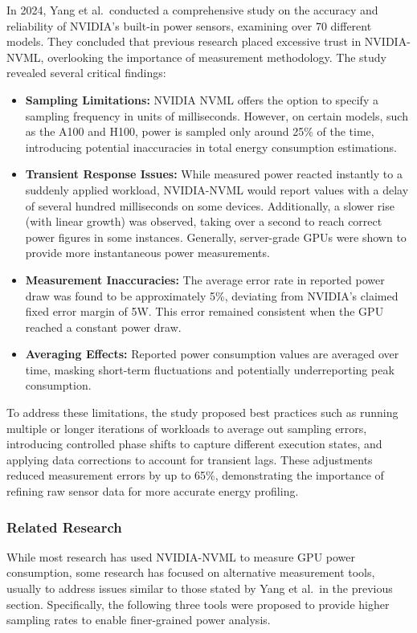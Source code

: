 In 2024, Yang et al.\ conducted a comprehensive study on the accuracy and reliability of NVIDIA's built-in power sensors, examining over 70 different models\cite{yang2024accurate}. They concluded that previous research placed excessive trust in NVIDIA-NVML, overlooking the importance of measurement methodology. The study revealed several critical findings:
\begin{itemize}
    \item \textbf{Sampling Limitations:} NVIDIA NVML offers the option to specify a sampling frequency in units of milliseconds. However, on certain models, such as the A100 and H100, power is sampled only around 25\% of the time, introducing potential inaccuracies in total energy consumption estimations.
    \item \textbf{Transient Response Issues:} While measured power reacted instantly to a suddenly applied workload, NVIDIA-NVML would report values with a delay of several hundred milliseconds on some devices. Additionally, a slower rise (with linear growth) was observed, taking over a second to reach correct power figures in some instances. Generally, server-grade GPUs were shown to provide more instantaneous power measurements.
    \item \textbf{Measurement Inaccuracies:} The average error rate in reported power draw was found to be approximately 5\%, deviating from NVIDIA's claimed fixed error margin of 5W. This error remained consistent when the GPU reached a constant power draw.
    \item \textbf{Averaging Effects:} Reported power consumption values are averaged over time, masking short-term fluctuations and potentially underreporting peak consumption.
\end{itemize}

To address these limitations, the study proposed best practices such as running multiple or longer iterations of workloads to average out sampling errors, introducing controlled phase shifts to capture different execution states, and applying data corrections to account for transient lags\cite{yang2024accurate}. These adjustments reduced measurement errors by up to 65\%, demonstrating the importance of refining raw sensor data for more accurate energy profiling.

\subsubsection{Related Research}

While most research has used NVIDIA-NVML to measure GPU power consumption, some research has focused on alternative measurement tools, usually to address issues similar to those stated by Yang et al.\ in the previous section. Specifically, the following three tools were proposed to provide higher sampling rates to enable finer-grained power analysis.

